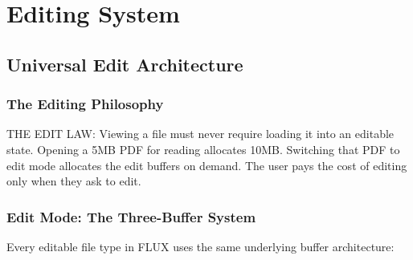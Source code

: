 \documentclass[11pt, a4paper, openright]{report}
\begin{document}
\part{Editing System}

\chapter{Universal Edit Architecture}

\section{The Editing Philosophy}

\begin{lawbox}
THE EDIT LAW: Viewing a file must never require loading it into an editable state. Opening a 5MB PDF for reading allocates 10MB. Switching that PDF to edit mode allocates the edit buffers on demand. The user pays the cost of editing only when they ask to edit.
\end{lawbox}

\section{Edit Mode: The Three-Buffer System}

Every editable file type in FLUX uses the same underlying buffer architecture:
\end{document}
